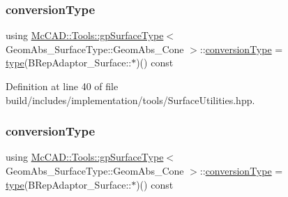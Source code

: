 \subsubsection{\texorpdfstring{conversion\+Type}{conversionType}\hspace{0.1cm}{\footnotesize\ttfamily [1/2]}}
{\footnotesize\ttfamily using \hyperlink{structMcCAD_1_1Tools_1_1gpSurfaceType}{Mc\+C\+A\+D\+::\+Tools\+::gp\+Surface\+Type}$<$ Geom\+Abs\+\_\+\+Surface\+Type\+::\+Geom\+Abs\+\_\+\+Cone $>$\+::\hyperlink{structMcCAD_1_1Tools_1_1gpSurfaceType_3_01GeomAbs__SurfaceType_1_1GeomAbs__Cone_01_4_ac8a1ab6a2261261ea3b9d10002f0f89d}{conversion\+Type} =  \hyperlink{structMcCAD_1_1Tools_1_1gpSurfaceType_3_01GeomAbs__SurfaceType_1_1GeomAbs__Cone_01_4_a45a7bfeee0dd094ad2d703572b0cff94}{type}(B\+Rep\+Adaptor\+\_\+\+Surface\+::$\ast$)() const}



Definition at line 40 of file build/includes/implementation/tools/\+Surface\+Utilities.\+hpp.

\mbox{\label{structMcCAD_1_1Tools_1_1gpSurfaceType_3_01GeomAbs__SurfaceType_1_1GeomAbs__Cone_01_4_ac8a1ab6a2261261ea3b9d10002f0f89d}} 
\subsubsection{\texorpdfstring{conversion\+Type}{conversionType}\hspace{0.1cm}{\footnotesize\ttfamily [2/2]}}
{\footnotesize\ttfamily using \hyperlink{structMcCAD_1_1Tools_1_1gpSurfaceType}{Mc\+C\+A\+D\+::\+Tools\+::gp\+Surface\+Type}$<$ Geom\+Abs\+\_\+\+Surface\+Type\+::\+Geom\+Abs\+\_\+\+Cone $>$\+::\hyperlink{structMcCAD_1_1Tools_1_1gpSurfaceType_3_01GeomAbs__SurfaceType_1_1GeomAbs__Cone_01_4_ac8a1ab6a2261261ea3b9d10002f0f89d}{conversion\+Type} =  \hyperlink{structMcCAD_1_1Tools_1_1gpSurfaceType_3_01GeomAbs__SurfaceType_1_1GeomAbs__Cone_01_4_a45a7bfeee0dd094ad2d703572b0cff94}{type}(B\+Rep\+Adaptor\+\_\+\+Surface\+::$\ast$)() const}




